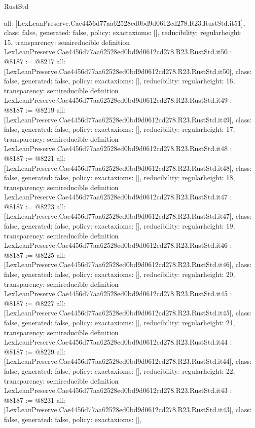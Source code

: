 \begin{lexlean}{RustStd}
\begin{coremodule}
{  all: [LexLeanPreserve.Cae4456d77aa62528ed0bd9d0612cd278.R23.RustStd.it51],
  class: false,
  generated: false,
  policy: exact{axioms: []},
  reducibility: regular{height: 15},
  transparency: semireducible
}
definition LexLeanPreserve.Cae4456d77aa62528ed0bd9d0612cd278.R23.RustStd.it50 : @8187 := @8217 {
  all: [LexLeanPreserve.Cae4456d77aa62528ed0bd9d0612cd278.R23.RustStd.it50],
  class: false,
  generated: false,
  policy: exact{axioms: []},
  reducibility: regular{height: 16},
  transparency: semireducible
}
definition LexLeanPreserve.Cae4456d77aa62528ed0bd9d0612cd278.R23.RustStd.it49 : @8187 := @8219 {
  all: [LexLeanPreserve.Cae4456d77aa62528ed0bd9d0612cd278.R23.RustStd.it49],
  class: false,
  generated: false,
  policy: exact{axioms: []},
  reducibility: regular{height: 17},
  transparency: semireducible
}
definition LexLeanPreserve.Cae4456d77aa62528ed0bd9d0612cd278.R23.RustStd.it48 : @8187 := @8221 {
  all: [LexLeanPreserve.Cae4456d77aa62528ed0bd9d0612cd278.R23.RustStd.it48],
  class: false,
  generated: false,
  policy: exact{axioms: []},
  reducibility: regular{height: 18},
  transparency: semireducible
}
definition LexLeanPreserve.Cae4456d77aa62528ed0bd9d0612cd278.R23.RustStd.it47 : @8187 := @8223 {
  all: [LexLeanPreserve.Cae4456d77aa62528ed0bd9d0612cd278.R23.RustStd.it47],
  class: false,
  generated: false,
  policy: exact{axioms: []},
  reducibility: regular{height: 19},
  transparency: semireducible
}
definition LexLeanPreserve.Cae4456d77aa62528ed0bd9d0612cd278.R23.RustStd.it46 : @8187 := @8225 {
  all: [LexLeanPreserve.Cae4456d77aa62528ed0bd9d0612cd278.R23.RustStd.it46],
  class: false,
  generated: false,
  policy: exact{axioms: []},
  reducibility: regular{height: 20},
  transparency: semireducible
}
definition LexLeanPreserve.Cae4456d77aa62528ed0bd9d0612cd278.R23.RustStd.it45 : @8187 := @8227 {
  all: [LexLeanPreserve.Cae4456d77aa62528ed0bd9d0612cd278.R23.RustStd.it45],
  class: false,
  generated: false,
  policy: exact{axioms: []},
  reducibility: regular{height: 21},
  transparency: semireducible
}
definition LexLeanPreserve.Cae4456d77aa62528ed0bd9d0612cd278.R23.RustStd.it44 : @8187 := @8229 {
  all: [LexLeanPreserve.Cae4456d77aa62528ed0bd9d0612cd278.R23.RustStd.it44],
  class: false,
  generated: false,
  policy: exact{axioms: []},
  reducibility: regular{height: 22},
  transparency: semireducible
}
definition LexLeanPreserve.Cae4456d77aa62528ed0bd9d0612cd278.R23.RustStd.it43 : @8187 := @8231 {
  all: [LexLeanPreserve.Cae4456d77aa62528ed0bd9d0612cd278.R23.RustStd.it43],
  class: false,
  generated: false,
  policy: exact{axioms: []},
}
\end{coremodule}
\end{lexlean}
